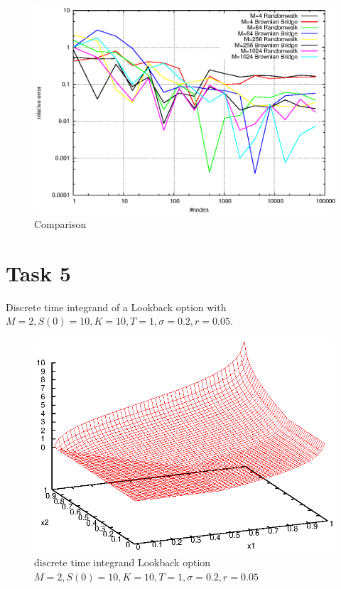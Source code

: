 \documentclass[]{article}
\begin{document}
\begin{figure}[!ht]
\centering
\includegraphics[width=.9\textwidth]{task4_mc.eps}
\caption{Comparison}
\label{fig:Task4e}
\end{figure}
\clearpage

\section*{Task 5}
Discrete time integrand of a Lookback option with $M=2,S(0)=10,K=10,T=1,\sigma=0.2,r=0.05$.
\begin{figure}[!ht]
\centering
\includegraphics[width=.9\textwidth]{task5.eps}
\caption{discrete time integrand Lookback option $M=2,S(0)=10,K=10,T=1,\sigma=0.2,r=0.05$}
\label{fig:Task5}
\end{figure}
\clearpage
\end{document}
